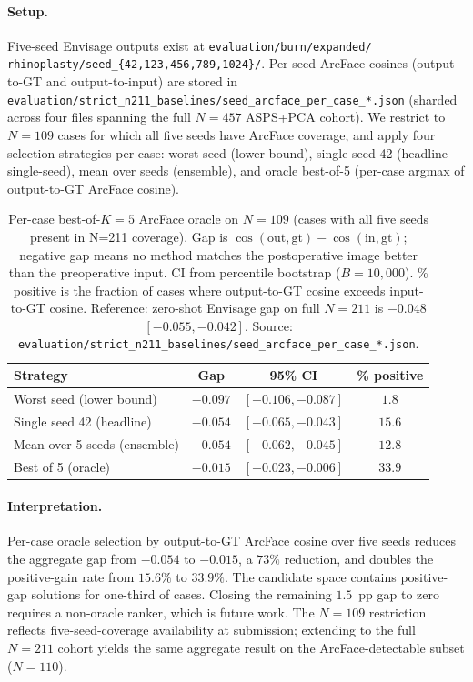 \documentclass{article}
\newcommand{\method}{Envisage}
\begin{document}
\paragraph{Setup.}
Five-seed \method{} outputs exist at \texttt{evaluation/burn/expanded/}
\texttt{rhinoplasty/seed\_\{42,123,456,789,1024\}/}. Per-seed ArcFace
cosines (output-to-GT and output-to-input) are stored in
\texttt{evaluation/strict\_n211\_baselines/}\linebreak\texttt{seed\_arcface\_per\_case\_*.json}
(sharded across four files spanning the full $N{=}457$ ASPS+PCA cohort).
We restrict to $N{=}109$ cases for which all five seeds have ArcFace coverage,
and apply four selection strategies per case: worst seed (lower bound),
single seed 42 (headline single-seed), mean over seeds (ensemble), and
oracle best-of-5 (per-case argmax of output-to-GT ArcFace cosine).

\begin{table}[h]
\centering
\small
\caption{Per-case best-of-$K{=}5$ ArcFace oracle on $N{=}109$ (cases with
all five seeds present in N=211 coverage). Gap is
$\cos(\text{out},\text{gt}) - \cos(\text{in},\text{gt})$; negative gap means no
method matches the postoperative image better than the preoperative input.
CI from percentile bootstrap ($B{=}10{,}000$). \% positive is the fraction of
cases where output-to-GT cosine exceeds input-to-GT cosine.
Reference: zero-shot \method{} gap on full $N{=}211$ is $-0.048$
$[-0.055, -0.042]$.
Source: \texttt{evaluation/strict\_n211\_baselines/seed\_arcface\_per\_case\_*.json}.}
\label{tab:best_of_k}
\begin{tabular}{@{}lccc@{}}
\toprule
\textbf{Strategy} & \textbf{Gap} & \textbf{95\% CI} & \textbf{\% positive} \\
\midrule
Worst seed (lower bound)     & $-0.097$ & $[-0.106, -0.087]$ & $1.8$ \\
Single seed 42 (headline)    & $-0.054$ & $[-0.065, -0.043]$ & $15.6$ \\
Mean over 5 seeds (ensemble) & $-0.054$ & $[-0.062, -0.045]$ & $12.8$ \\
Best of 5 (oracle)           & $-0.015$ & $[-0.023, -0.006]$ & $33.9$ \\
\bottomrule
\end{tabular}
\end{table}

\paragraph{Interpretation.}
Per-case oracle selection by output-to-GT ArcFace cosine over five seeds reduces
the aggregate gap from $-0.054$ to $-0.015$, a $73\%$ reduction, and doubles the
positive-gain rate from $15.6\%$ to $33.9\%$.
The candidate space contains positive-gap solutions for one-third of cases.
Closing the remaining $1.5$~pp gap to zero requires a non-oracle ranker, which is
future work. The $N{=}109$ restriction reflects five-seed-coverage availability at
submission; extending to the full $N{=}211$ cohort yields the same aggregate
result on the ArcFace-detectable subset ($N{=}110$).
\end{document}
